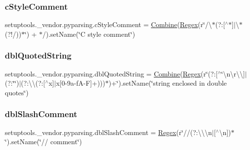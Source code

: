 \subsubsection{\texorpdfstring{c\+Style\+Comment}{cStyleComment}}
{\footnotesize\ttfamily setuptools.\+\_\+vendor.\+pyparsing.\+c\+Style\+Comment = \hyperlink{classsetuptools_1_1__vendor_1_1pyparsing_1_1_combine}{Combine}(\hyperlink{classsetuptools_1_1__vendor_1_1pyparsing_1_1_regex}{Regex}(r\char`\"{}/\textbackslash{}$\ast$(?\+:\mbox{[}$^\wedge$$\ast$\mbox{]}$\vert$\textbackslash{}$\ast$(?!/))$\ast$\char`\"{}) + \textquotesingle{}$\ast$/\textquotesingle{}).set\+Name(\char`\"{}C style comment\char`\"{})}

\mbox{\label{namespacesetuptools_1_1__vendor_1_1pyparsing_ac4d6fae3a4931690edcafde787349ca3}} 
\subsubsection{\texorpdfstring{dbl\+Quoted\+String}{dblQuotedString}}
{\footnotesize\ttfamily setuptools.\+\_\+vendor.\+pyparsing.\+dbl\+Quoted\+String = \hyperlink{classsetuptools_1_1__vendor_1_1pyparsing_1_1_combine}{Combine}(\hyperlink{classsetuptools_1_1__vendor_1_1pyparsing_1_1_regex}{Regex}(r\textquotesingle{}\char`\"{}(?\+:\mbox{[}$^\wedge$\char`\"{}\textbackslash{}n\textbackslash{}r\textbackslash{}\textbackslash{}\mbox{]}$\vert$(?\+:\char`\"{}\char`\"{})$\vert$(?\+:\textbackslash{}\textbackslash{}(?\+:\mbox{[}$^\wedge$x\mbox{]}$\vert$x\mbox{[}0-\/9a-\/f\+A-\/\+F\mbox{]}+)))$\ast$\textquotesingle{})+\textquotesingle{}\char`\"{}\textquotesingle{}).\+set\+Name(\char`\"{}string enclosed in double quotes\char`\"{})}

\mbox{\label{namespacesetuptools_1_1__vendor_1_1pyparsing_abea5f9cf7a219d118afd0853030c9fbf}} 
\subsubsection{\texorpdfstring{dbl\+Slash\+Comment}{dblSlashComment}}
{\footnotesize\ttfamily setuptools.\+\_\+vendor.\+pyparsing.\+dbl\+Slash\+Comment = \hyperlink{classsetuptools_1_1__vendor_1_1pyparsing_1_1_regex}{Regex}(r\char`\"{}//(?\+:\textbackslash{}\textbackslash{}\textbackslash{}n$\vert$\mbox{[}$^\wedge$\textbackslash{}n\mbox{]})$\ast$\char`\"{}).set\+Name(\char`\"{}// comment\char`\"{})}

